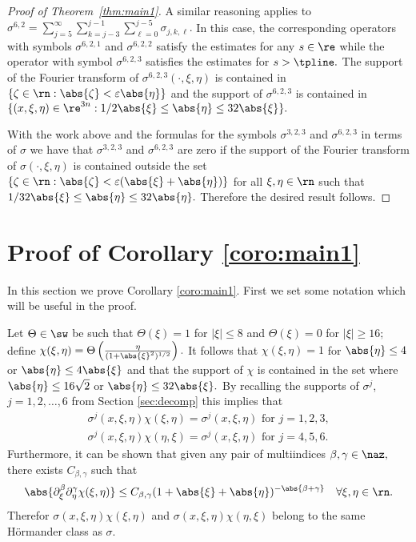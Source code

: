\begin{proof}[Proof of Theorem~\ref{thm:main1}]
A similar reasoning applies to $\sigma^{6,2}=\sum_{j=5}^\infty\sum_{k=j-3}^{j-1}\sum_{\ell=0}^{j-5}\sigma_{j,k,\ell}.$ In this case, the corresponding operators with symbols $\sigma^{6,2,1}$ and $\sigma^{6,2,2}$ satisfy the estimates for any $s\in \re$ while the operator with symbol $\sigma^{6,2,3}$ satisfies the estimates for $s>\tpline.$ The support of the Fourier transform of  $\sigma^{6,2,3}(\cdot,\xi,\eta)$ is contained in  $\{\zeta\in\rn: \abs{\zeta}< \varepsilon\abs{\eta}\}$ and the support of $\sigma^{6,2,3}$ is contained   in  $\{(x,\xi,\eta)\in\re^{3n}: 1/2\abs{\xi}\le\abs{\eta}\le 32\abs{\xi}\}.$

With the work above and the formulas for the symbols $\sigma^{3,2,3}$ and $\sigma^{6,2,3}$ in terms of $\sigma$ we have that $\sigma^{3,2,3}$ and $\sigma^{6,2,3}$ are zero if  the support of the Fourier transform of $\sigma(\cdot,\xi,\eta)$ is contained outside the set 
$\{\zeta\in\rn:\abs{\zeta}<\varepsilon (\abs{\xi}+\abs{\eta})\}$ for all  $\xi,\eta\in\rn$ such that $1/32\abs{\xi}\le \abs{\eta}\le 32 \abs{\eta}.$ Therefore the desired result follows.
 

\end{proof}
\section{Proof of Corollary \ref{coro:main1}}

In this section we prove Corollary \ref{coro:main1}. First we set some notation which will be useful in the proof. 


 Let  $\Theta\in \sw$ be such that $\Theta(\xi)=1$ for $|\xi|\le 8$ and $\Theta(\xi)=0$ for $|\xi|\ge 16;$ define $\chi(\xi,\eta)=\Theta\left(\frac{\eta}{(1+\abs{\xi}^2)^{1/2}}\right).$ It follows that $\chi(\xi,\eta)=1$ for $\abs{\eta}\le 4$ or $\abs{\eta}\le 4\abs{\xi}$ and that the support of  $\chi$ is contained in the set where $ \abs{\eta}\le 16 \sqrt{2}$ or $\abs{\eta}\le 32\abs{\xi}.$ By recalling the supports of $\sigma^j$, $j = 1,2,\dots,6$ from Section \ref{sec:decomp} this implies  that 
 \begin{align*}
 \sigma^{j}(x,\xi,\eta)\chi(\xi,\eta)=\sigma^{j}(x,\xi,\eta) \text{ for } j=1,2, 3,\\
  \sigma^{j}(x,\xi,\eta)\chi(\eta,\xi)=\sigma^{j}(x,\xi,\eta)\text{ for } j=4, 5,6.
 \end{align*}
 Furthermore, it can be shown that given any pair of multiindices $\beta,\gamma\in \naz,$ there exists $C_{\beta,\gamma}$ such that
 \begin{equation*}
 \abs{\partial_\xi^\beta\partial_\eta^\gamma\chi(\xi,\eta)}\le C_{\beta,\gamma} (1+\abs{\xi}+\abs{\eta})^{-\abs{\beta+\gamma}}\quad \forall \xi,\eta\in \rn.
 \end{equation*}
 Therefor $\sigma(x,\xi,\eta)\chi(\xi,\eta)$ and $\sigma(x,\xi,\eta)\chi(\eta,\xi)$ belong to the same H\"ormander class as $\sigma.$



